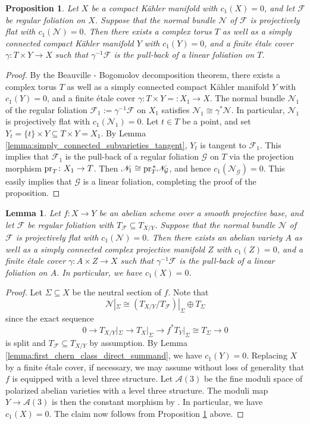 \documentclass[english,10pt]{amsart}
\newcommand{\cF}{\mathcal{F}}
\newcommand{\cG}{\mathcal{G}}
\newcommand{\sA}{\mathscr{A}}
\newcommand{\sN}{\mathscr{N}}
\newtheorem{lemma}[thm]{Lemma}
\newtheorem{prop}[thm]{Proposition}
\theoremstyle{definition}
\theoremstyle{remark}
\numberwithin{equation}{section}
\begin{document}
\begin{prop}\label{prop:av}
Let $X$ be a compact K\"ahler manifold with $c_1(X)=0$, and let $\cF$ be regular foliation on $X$. Suppose that the normal bundle $\sN$ of $\cF$ is projectively flat with $c_1(\sN)=0$. Then there exists a complex torus $T$ as well as a simply connected compact K\"ahler manifold $Y$ with $c_1(Y)=0$, and a finite \'etale cover $\gamma \colon T \times Y \to X$ such that $\gamma^{-1}\cF$ is the pull-back of a linear foliation on $T$.
\end{prop}

\begin{proof}
By the Beauville - Bogomolov decomposition theorem, there exists a complex torus $T$ as well as a simply connected compact K\"ahler manifold $Y$ with $c_1(Y)=0$, and a finite \'etale cover $\gamma \colon T \times Y=:X_1 \to X$. The normal bundle $\sN_1$ of the regular foliation $\cF_1:= \gamma^{-1}\cF$ on $X_1$ satisfies $\sN_1 \cong \gamma^*\sN$. In particular, $\sN_1$ is projectively flat with $c_1(\sN_1)=0$. Let $t \in T$ be a point, and set $Y_t=\{t\} \times Y \subseteq T \times Y=X_1$. By Lemma \ref{lemma:simply_connected_subvarieties_tangent}, $Y_t$ is tangent to $\cF_1$. This implies that $\cF_1$ is the pull-back of a regular foliation $\cG$ on $T$ via the projection morphism $\textup{pr}_T\colon X_1 \to T$. Then 
$\sN_1 \cong \textup{pr}_T^{\,*}\sN_{\cG}$, and hence $c_1(\sN_{\cG})=0$. This easily implies that $\cG$ is a linear foliation, completing the proof of the proposition.
\end{proof}

\begin{lemma}\label{lemma:ab_schemes}
Let $f \colon X \to Y$ be an abelian scheme over a smooth projective base, and let $\cF$ be regular foliation with $T_\cF \subseteq T_{X/Y}$. Suppose that the normal bundle $\sN$ of $\cF$ is projectively flat with $c_1(\sN)=0$. Then there exists an abelian variety $A$ as well as a simply connected complex projective manifold $Z$ with $c_1(Z)=0$, and a finite \'etale cover $\gamma \colon A \times Z \to X$ such that $\gamma^{-1}\cF$ is the pull-back of a linear foliation on $A$. In particular, we have $c_1(X)=0$.
\end{lemma}

\begin{proof}
Let $\Sigma\subseteq X$ be the neutral section of $f$. Note that 
\[
\sN|_\Sigma \cong (T_{X/Y}/ T_\cF)|_\Sigma \oplus T_\Sigma
\]
since the exact sequence 
\[
0 \to T_{X/Y}|_\Sigma \to T_X|_\Sigma \to f^*T_Y|_\Sigma \cong T_\Sigma \to 0
\]
is split and $T_\cF\subseteq T_{X/Y}$ by assumption. By Lemma \ref{lemma:first_chern_class_direct_summand}, we have $c_1(Y)=0$. Replacing $X$ by a finite \'etale cover, if necessary, we may assume without loss of generality that $f$ is equipped with a level three structure. Let $\sA(3)$ be the fine moduli space of polarized abelian varieties with a level three structure. The moduli map $Y \to \sA(3)$ is then the constant morphism by \cite[Lemma 5.9.3]{kollar_sh_inventiones}. In particular, we have $c_1(X)=0$. The claim now follows from 
Proposition \ref{prop:av} above.
\end{proof}
\end{document}
